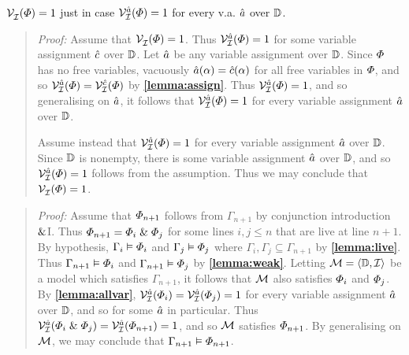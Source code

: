 \begin{Lthm} \label{lemma:allvar}
  $\mathcal{V}_{\mathcal{I}}^{}(\varPhi)= 1$ just in case $\mathcal{V}_{\mathcal{I}}^{\hat{a}}(\varPhi)= 1$ for every v.a. $\hat{a}$ over $\mathbb{D}$. 
\end{Lthm}
\begin{quote} 
  \textit{Proof:} 
       Assume that $\mathcal{V}_{\mathcal{I}}^{}(\varPhi)= 1$.
       Thus $\mathcal{V}_{\mathcal{I}}^{\hat{a}}(\varPhi)= 1$ for some variable assignment $\hat{c}$ over $\mathbb{D}$.
       Let $\hat{a}$ be any variable assignment over $\mathbb{D}$.
       Since $\varPhi$ has no free variables, vacuously $\hat{a}(\alpha)=\hat{c}(\alpha)$ for all free variables in $\varPhi$, and so $\mathcal{V}_{\mathcal{I}}^{\hat{a}}(\varPhi)=\mathcal{V}_{\mathcal{I}}^{\hat{c}}(\varPhi)$ by \textbf{\ref{lemma:assign}}.
       Thus $\mathcal{V}_{\mathcal{I}}^{\hat{a}}(\varPhi)=1$, and so generalising on $\hat{a}$, it follows that $\mathcal{V}_{\mathcal{I}}^{\hat{a}}(\varPhi)= 1$ for every variable assignment $\hat{a}$ over $\mathbb{D}$.  

       Assume instead that $\mathcal{V}_{\mathcal{I}}^{\hat{a}}(\varPhi)=1$ for every variable assignment $\hat{a}$ over $\mathbb{D}$.
       Since $\mathbb{D}$ is nonempty, there is some variable assignment $\hat{a}$ over $\mathbb{D}$, and so $\mathcal{V}_{\mathcal{I}}^{\hat{a}}(\varPhi)=1$ follows from the assumption. 
       Thus we may conclude that $\mathcal{V}_{\mathcal{I}}^{}(\varPhi)=1$.
\end{quote}





  
\label{rule:ConI}

\begin{quote} 
  \textit{Proof:} Assume that $\varPhi_{n+1}$ follows from $\Gamma_{n+1}$ by conjunction introduction $\mathrel\&$I.
  Thus $\varPhi_{n+1}=\varPhi_i\mathrel\&\varPhi_j$ for some lines $i,j\leq n$ that are live at line $n+1$.
  By hypothesis, $\Gamma_i\vDash \varPhi_i$ and $\Gamma_j\vDash \varPhi_j$ where $\Gamma_i,\Gamma_j\subseteq \Gamma_{n+1}$ by \textbf{\ref{lemma:live}}.
  Thus $\Gamma_{n+1} \vDash \varPhi_i$ and $\Gamma_{n+1} \vDash \varPhi_j$ by \textbf{\ref{lemma:weak}}.
  Letting $\mathcal{M}=\langle\mathbb{D},\mathcal{I}\rangle$ be a model which satisfies $\Gamma_{n+1}$, it follows that $\mathcal{M}$ also satisfies $\varPhi_i$ and $\varPhi_j$.
  By \textbf{\ref{lemma:allvar}}, $\mathcal{V}_{\mathcal{I}}^{\hat{a}}(\varPhi_i)=\mathcal{V}_{\mathcal{I}}^{\hat{a}}(\varPhi_j)=1$ for every variable assignment $\hat{a}$ over $\mathbb{D}$, and so for some $\hat{a}$ in particular.
  Thus $\mathcal{V}_{\mathcal{I}}^{\hat{a}}(\varPhi_i\mathrel\&\varPhi_j)=\mathcal{V}_{\mathcal{I}}^{\hat{a}}(\varPhi_{n+1})=1$, and so $\mathcal{M}$ satisfies $\varPhi_{n+1}$.
  By generalising on $\mathcal{M}$, we may conclude that $\Gamma_{n+1} \vDash \varPhi_{n+1}$.
\end{quote}





